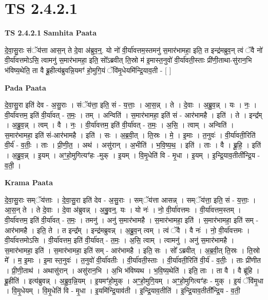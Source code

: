 \documentclass[17pt]{extarticle}
\begin{document}
\section{ TS 2.4.2.1 }

\textbf{TS 2.4.2.1 } \newline
\textbf{Samhita Paata} \newline

दे॒वा॒सु॒राः संॅय॑त्ता आस॒न् ते दे॒वा अ॑ब्रुव॒न्॒. यो नो॑ वी॒र्या॑वत्तम॒स्तमनु॑ स॒मार॑भामहा॒ इति॒ त इन्द्र॑मब्रुव॒न् त्वं ॅवै नो॑ वी॒र्या॑वत्तमोऽसि॒ त्वामनु॑ स॒मार॑भामहा॒ इति॒ सो᳚ऽब्रवीत् ति॒स्रो म॑ इ॒मास्त॒नुवो॑ वी॒र्या॑वती॒स्ताः प्री॑णी॒ताथा-सु॑रान॒भि भ॑विष्य॒थेति॒ ता वै ब्रू॒हीत्य॑ब्रुवन्नि॒यमꣳ॑ हो॒मुगि॒यं ॅवि॑मृ॒धेयमि॑न्द्रि॒याव॒ती - [  ] \newline

\textbf{Pada Paata} \newline

दे॒वा॒सु॒रा इति॑ देव - अ॒सु॒राः । संॅय॑त्ता॒ इति॒ सं - य॒त्ताः॒ । आ॒स॒न्न् । ते । दे॒वाः । अ॒ब्रु॒व॒न्न् । यः । नः॒ । वी॒र्या॑वत्तम॒ इति॑ वी॒र्या॑वत् - त॒मः॒ । तम् । अन्विति॑ । स॒मार॑भामहा॒ इति॑ सं - आर॑भामहै । इति॑ । ते । इन्द्र᳚म् । अ॒ब्रु॒व॒न्न् । त्वम् । वै । नः॒ । वी॒र्या॑वत्तम॒ इति॑ वी॒र्या॑वत् - त॒मः॒ । अ॒सि॒ । त्वाम् । अन्विति॑ । स॒मार॑भामहा॒ इति॑ सं-आर॑भामहै । इति॑ । सः । अ॒ब्र॒वी॒त् । ति॒स्रः । मे॒ । इ॒माः । त॒नुवः॑ । वी॒र्या॑वती॒रिति॑ वी॒र्य॑ - व॒तीः॒ । ताः । प्री॒णी॒त॒ । अथ॑ । असु॑रान् । अ॒भीति॑ । भ॒वि॒ष्य॒थ॒ । इति॑ । ताः । वै । ब्रू॒हि॒ । इति॑ । अ॒ब्रु॒व॒न्न् । इ॒यम् । अꣳ॒॒हो॒मुगित्यꣳ॑हः -मुक् । इ॒यम् । वि॒मृ॒धेति॑ वि - मृ॒धा । इ॒यम् । इ॒न्द्रि॒याव॒तीती᳚न्द्रि॒य - व॒ती॒ ।  \newline


\textbf{Krama Paata} \newline

दे॒वा॒सु॒राः सम्ॅय॑त्ताः । दे॒वा॒सु॒रा इति॑ देव - अ॒सु॒राः । सम्ॅय॑त्ता आसन्न् । सम्ॅय॑त्ता॒ इति॒ सं - य॒त्ताः॒ । आ॒स॒न् ते । 
ते दे॒वाः । दे॒वा अ॑ब्रुवन्न् । अ॒बु॒॒वन्॒. यः । यो नः॑ । नो॒ वी॒र्या॑वत्तमः । वी॒र्या॑वत्तम॒स्तम् । वी॒र्या॑वत्तम॒ इति॑ वी॒र्या॑वत् - त॒मः॒ । तमनु॑ । अनु॑ स॒मार॑भामहै । स॒मार॑भामहा॒ इति॑ । स॒मार॑भामहा॒ इति॑ सम् - आर॑भामहै । इति॒ ते । त इन्द्र᳚म् । इन्द्र॑मब्रुवन्न् । अ॒ब्रु॒व॒न् त्वम् । त्वं ॅवै । वै नः॑ । नो॒ वी॒र्या॑वत्तमः । वी॒र्या॑वत्तमोऽसि । वी॒र्या॑वत्तम॒ इति॑ वी॒र्या॑वत् - त॒मः॒ । अ॒सि॒ त्वाम् । त्वामनु॑ । अनु॑ स॒मार॑भामहै । स॒मार॑भामहा॒ इति॑ । स॒मार॑भामहा॒ इति॑ सम् - आर॑भामहै । इति॒ सः । सो᳚ ऽब्रवीत् । अ॒ब्र॒वी॒त् ति॒स्रः । ति॒स्रो मे᳚ । म॒ इ॒माः । इ॒मा स्त॒नुवः॑ । त॒नुवो॑ वी॒र्या॑वतीः । वी॒र्या॑वती॒स्ताः । वी॒र्या॑वती॒रिति॑ वी॒र्य॑ - व॒तीः॒ । ताः प्री॑णीत । प्री॒णी॒ताथ॑ । अथासु॑रान् । असु॑रान॒भि । अ॒भि भ॑विष्यथ । भ॒वि॒ष्य॒थेति॑ । इति॒ ताः । ता वै । वै ब्रू॑हि । ब्रू॒हीति॑ । इत्य॑ब्रुवन्न् । अ॒ब्रु॒व॒न्नि॒यम् । इ॒यमꣳ॑हो॒मुक् । अꣳ॒॒हो॒मुगि॒यम् । अꣳ॒॒हो॒मुगित्यꣳ॑हः - मुक् । इ॒यं ॅवि॑मृ॒धा । वि॒मृ॒धेयम् । वि॒मृ॒धेति॑ वि - मृ॒धा । इ॒यमि॑न्द्रि॒याव॑ती । इ॒न्द्रि॒याव॒तीति॑ । इ॒न्द्रि॒याव॒तीती᳚न्द्रि॒य - व॒ती॒ \newline
\end{document}
